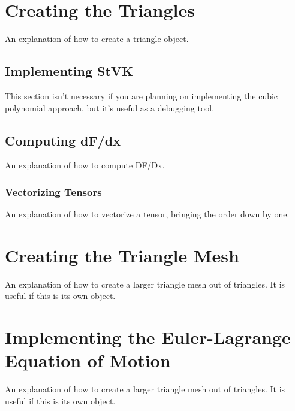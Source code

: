 \documentclass[twocolumn,10pt]{asme2ej}
\begin{document}
\section{Creating the Triangles}

An explanation of how to create a triangle object.

\subsection{Implementing StVK}

This section isn't necessary if you are planning on implementing the cubic polynomial approach, but it's useful
as a debugging tool.

\subsection{Computing dF/dx}

An explanation of how to compute DF/Dx.

\subsubsection{Vectorizing Tensors}

An explanation of how to vectorize a tensor, bringing the order down by one.

\section{Creating the Triangle Mesh}

An explanation of how to create a larger triangle mesh out of triangles. It is useful if this is its own
object.

\section{Implementing the Euler-Lagrange Equation of Motion}

An explanation of how to create a larger triangle mesh out of triangles. It is useful if this is its own
object.
\end{document}
